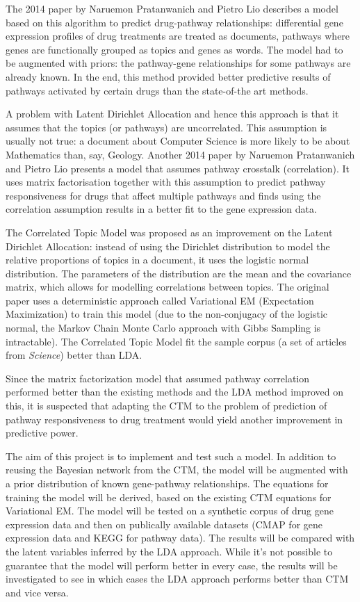 \documentclass[12pt,a4]{article}
\begin{document}
The 2014 paper\cite{Pratanwanich2014} by Naruemon Pratanwanich and Pietro Lio describes a model based on this algorithm to predict drug-pathway relationships: differential gene expression profiles of drug treatments are treated as documents, pathways where genes are functionally grouped as topics and genes as words. The model had to be augmented with priors: the pathway-gene relationships for some pathways are already known. In the end, this method provided better predictive results of pathways activated by certain drugs than the state-of-the art methods.

A problem with Latent Dirichlet Allocation and hence this approach is that it assumes that the topics (or pathways) are uncorrelated. This assumption is usually not true: a document about Computer Science is more likely to be about Mathematics than, say, Geology. Another 2014 paper\cite{C4MB00014E} by Naruemon Pratanwanich and Pietro Lio presents a model that assumes pathway crosstalk (correlation). It uses matrix factorisation together with this assumption to predict pathway responsiveness for drugs that affect multiple pathways and finds using the correlation assumption results in a better fit to the gene expression data.

The Correlated Topic Model\cite{2007} was proposed as an improvement on the Latent Dirichlet Allocation: instead of using the Dirichlet distribution to model the relative proportions of topics in a document, it uses the logistic normal distribution. The parameters of the distribution are the mean and the covariance matrix, which allows for modelling correlations between topics. The original paper\cite{2007} uses a deterministic approach called Variational EM (Expectation Maximization) to train this model (due to the non-conjugacy of the logistic normal, the Markov Chain Monte Carlo approach with Gibbs Sampling is intractable). The Correlated Topic Model fit the sample corpus (a set of articles from \textit{Science}) better than LDA\cite{2007}.

Since the matrix factorization model that assumed pathway correlation\cite{C4MB00014E} performed better than the existing methods and the LDA method\cite{Pratanwanich2014} improved on this, it is suspected that adapting the CTM to the problem of prediction of pathway responsiveness to drug treatment would yield another improvement in predictive power.

The aim of this project is to implement and test such a model. In addition to reusing the Bayesian network from the CTM, the model will be augmented with a prior distribution of known gene-pathway relationships. The equations for training the model will be derived, based on the existing CTM equations for Variational EM\cite{2007}. The model will be tested on a synthetic corpus of drug gene expression data and then on publically available datasets (CMAP\cite{CMap} for gene expression data and KEGG\cite{KEGG} for pathway data). The results will be compared with the latent variables inferred by the LDA approach. While it's not possible to guarantee that the model will perform better in every case, the results will be investigated to see in which cases the LDA approach performs better than CTM and vice versa.
\end{document}
